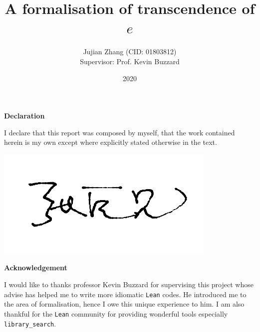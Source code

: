 \documentclass{report}
\title{A formalisation of transcendence of $e$}
\author{Jujian Zhang (CID: 01803812)\\[.5cm]{Supervisor: Prof. Kevin Buzzard}}
\date{2020}
\theoremstyle{definition}
\begin{document}
\maketitle

\clearpage\thispagestyle{empty}\addtocounter{page}{-1}
\begin{center}
  \textbf{Declaration}
\end{center}
I declare that this report was composed by myself, that the work contained herein is my own except where explicitly stated otherwise in the text.

\begin{flushright}
  \includegraphics[height=1.5\baselineskip]{signature.png}
\end{flushright}
\clearpage

\begin{center}
  \textbf{Acknowledgement}
\end{center}
I would like to thanks professor Kevin Buzzard for supervising this project whose advise has helped me to write more idiomatic {\tt \small Lean} codes. He introduced me to the area of formalisation, hence I owe this unique experience to him. I am also thankful for the {\tt\small Lean} community for providing wonderful tools especially {\tt\small library\_search}.
\clearpage
\end{document}
